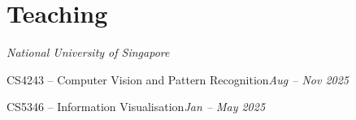 \section{Teaching}

\vspace{2pt}
\hfill{\color{muted}\small\itshape National University of Singapore}\par
\vspace{1pt}
\cvListStart
  \item CS4243 -- Computer Vision and Pattern Recognition\hfill{\color{muted}\small\itshape Aug -- Nov 2025}
  \item CS5346 -- Information Visualisation\hfill{\color{muted}\small\itshape Jan -- May 2025}
\cvListEnd
